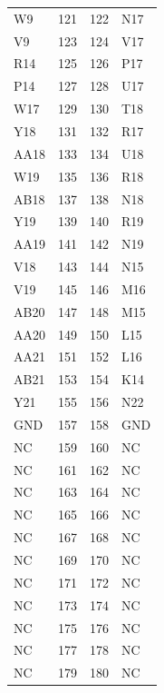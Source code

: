 \documentclass[12pt]{article}
\begin{document}
\begin{longtable}{P{2.5cm}P{1.5cm}P{1.5cm}P{2.5cm}}
 W9     & 121 & 122 & N17 \\
 V9     & 123 & 124 & V17 \\
 R14    & 125 & 126 & P17 \\
 P14    & 127 & 128 & U17 \\
 W17    & 129 & 130 & T18 \\
 Y18    & 131 & 132 & R17 \\
 AA18   & 133 & 134 & U18 \\
 W19    & 135 & 136 & R18 \\
 AB18   & 137 & 138 & N18 \\
 Y19    & 139 & 140 & R19 \\
 AA19   & 141 & 142 & N19 \\
 V18    & 143 & 144 & N15 \\
 V19    & 145 & 146 & M16 \\
 AB20   & 147 & 148 & M15 \\
 AA20   & 149 & 150 & L15 \\
 AA21   & 151 & 152 & L16 \\
 AB21   & 153 & 154 & K14 \\
 Y21    & 155 & 156 & N22 \\
 GND    & 157 & 158 & GND \\
 NC     & 159 & 160 & NC \\
 NC     & 161 & 162 & NC \\
 NC     & 163 & 164 & NC \\
 NC     & 165 & 166 & NC \\
 NC     & 167 & 168 & NC \\
 NC     & 169 & 170 & NC \\
 NC     & 171 & 172 & NC \\
 NC     & 173 & 174 & NC \\
 NC     & 175 & 176 & NC \\
 NC     & 177 & 178 & NC \\
 NC     & 179 & 180 & NC \\

\end{longtable}
\end{document}
